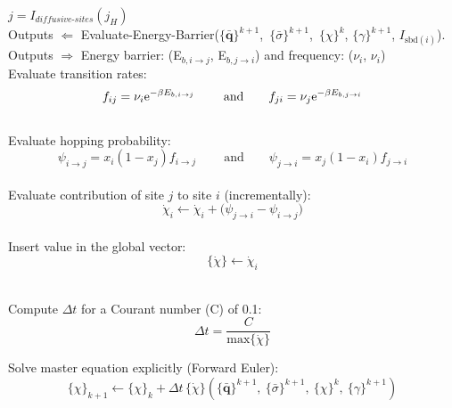 \documentclass{article}
\begin{document}
\begin{algorithm}
\begin{algorithmic}
            \State $j = I_{\textit{diffusive-sites}}(j_H)$ \\
    
            \State Outputs $\Leftarrow$ Evaluate-Energy-Barrier($\{\bar{\textbf{q}}\}^{k+1}$,\ $\{\bar{\sigma}\}^{k+1}$,\ $\{\chi\}^k$, $\{\gamma\}^{k+1}$, $I_{\text{sbd}(i)}$). \\
            
            \State Outputs $\Rightarrow$ Energy barrier: (E$_{b, i \rightarrow j}$, E$_{b, j \rightarrow i}$) and frequency: ($\nu_i$, $\nu_i$) \\
    
            \State Evaluate transition rates:
            \begin{equation*}
                f_{ij} = \nu_i {\rm e}^{-\beta E_{b,i \rightarrow j}}\ \qquad \text{and}  \qquad f_{ji} = \nu_j {\rm e}^{-\beta E_{b,j \rightarrow i}}
            \end{equation*}\\
    
            \State Evaluate hopping probability:
            \begin{equation*}
                 \psi_{i\to j} = x_i (1-x_j) f_{i\to j} \ \qquad \text{and}  \qquad \psi_{j\to i} = x_j (1-x_i) f_{j\to i} 
            \end{equation*}\\ 
    
            \State Evaluate contribution of site $j$ to site $i$ (incrementally):
            \begin{equation*}
            \dot{\chi}_i \leftarrow \dot{\chi}_i + \bigg(\psi_{j\to i} -\psi_{i\to j}\bigg)
            \end{equation*}    
       \EndFor \\
       \State Insert value in the global vector:
       \begin{equation*}
           \{\dot{\chi}\} \leftarrow \dot{\chi}_i
       \end{equation*}
    
        \vspace{0.2cm}     
    \EndFor\\
    
    \State Compute $\Delta t$ for a Courant number (C) of 0.1:
    \begin{equation*}
        \Delta t = \frac{C}{\text{max} \{\dot{\chi}\}}
    \end{equation*}
    
    \State Solve master equation explicitly (Forward Euler):
    \begin{equation*}
        \{\chi\}_{k+1} \leftarrow \{\chi\}_{k} + \Delta t\, \{\dot{\chi}\} (\{\bar{\textbf{q}}\}^{k+1},\ \{\bar{\sigma}\}^{k+1},\ \{\chi\}^k,\ \{\gamma\}^{k+1})
    \end{equation*}
    \end{algorithmic}
    \end{algorithm}
    
\end{document}
